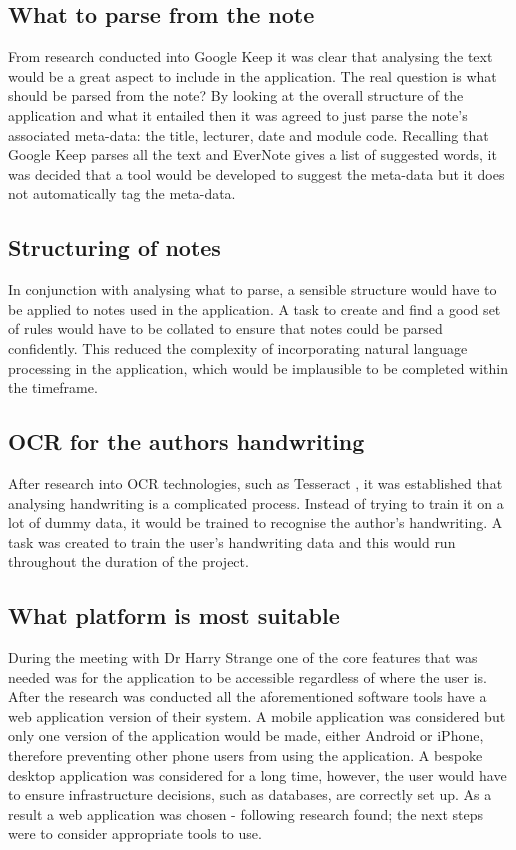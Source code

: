 \subsection{What to parse from the note}
From research conducted into Google Keep it was clear that analysing the text would be a great aspect to include in the application. The real question is what should be parsed from the note? By looking at the overall structure of the application and what it entailed then it was agreed to just parse the note's associated meta-data: the title, lecturer, date and module code. Recalling that Google Keep parses all the text and EverNote gives a list of suggested words, it was decided that a tool would be developed to suggest the meta-data but it does not automatically tag the meta-data.

\subsection{Structuring of notes}
In conjunction with analysing what to parse, a sensible structure would have to be applied to notes used in the application. A task to create and find a good set of rules would have to be collated to ensure that notes could be parsed confidently. This reduced the complexity of incorporating natural language processing in the application, which would be implausible to be completed within the timeframe.


\subsection{OCR for the authors handwriting}
After research into OCR technologies, such as Tesseract \cite{citeulike:14014368}, it was established that analysing handwriting is a complicated process. Instead of trying to train it on a lot of dummy data, it would be trained to recognise the author's handwriting. A task was created to train the user's handwriting data and this would run throughout the duration of the project.


\subsection{What platform is most suitable}
During the meeting with Dr Harry Strange one of the core features that was needed was for the application to be accessible regardless of where the user is. After the research was conducted all the aforementioned software tools have a web application version of their system. A mobile application was considered but only one version of the application would be made, either Android or iPhone, therefore preventing other phone users from using the application. A bespoke desktop application was considered for a long time, however, the user would have to ensure infrastructure decisions, such as databases, are correctly set up. As a result a web application was chosen - following research found; the next steps were to consider appropriate tools to use.

